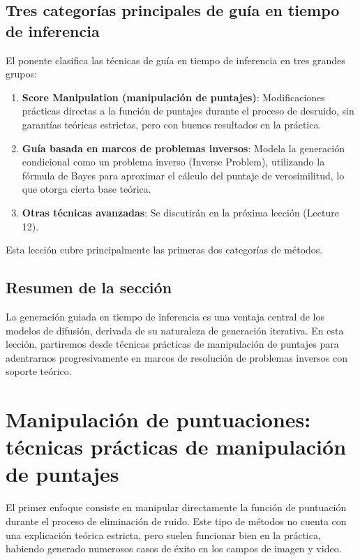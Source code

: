 \documentclass[a4paper]{article}
\begin{document}
\subsection{Tres categorías principales de guía en tiempo de inferencia}

El ponente clasifica las técnicas de guía en tiempo de inferencia en tres grandes grupos:

\begin{enumerate}
    \item \textbf{Score Manipulation (manipulación de puntajes)}: Modificaciones prácticas directas a la función de puntajes durante el proceso de desruido, sin garantías teóricas estrictas, pero con buenos resultados en la práctica.
    \item \textbf{Guía basada en marcos de problemas inversos}: Modela la generación condicional como un problema inverso (Inverse Problem), utilizando la fórmula de Bayes para aproximar el cálculo del puntaje de verosimilitud, lo que otorga cierta base teórica.
    \item \textbf{Otras técnicas avanzadas}: Se discutirán en la próxima lección (Lecture 12).
\end{enumerate}

Esta lección cubre principalmente las primeras dos categorías de métodos.

\subsection{Resumen de la sección}

La generación guiada en tiempo de inferencia es una ventaja central de los modelos de difusión, derivada de su naturaleza de generación iterativa. En esta lección, partiremos desde técnicas prácticas de manipulación de puntajes para adentrarnos progresivamente en marcos de resolución de problemas inversos con soporte teórico.



\section{Manipulación de puntuaciones: técnicas prácticas de manipulación de puntajes}

El primer enfoque consiste en manipular directamente la función de puntuación durante el proceso de eliminación de ruido. Este tipo de métodos no cuenta con una explicación teórica estricta, pero suelen funcionar bien en la práctica, habiendo generado numerosos casos de éxito en los campos de imagen y video.
\end{document}
